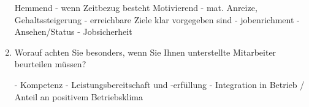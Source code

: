 \documentclass[12pt,a4paper]{scrreprt}
\begin{document}
\begin{enumerate}
Hemmend
- wenn Zeitbezug besteht
Motivierend
- mat. Anreize, Gehaltssteigerung
- erreichbare Ziele klar vorgegeben sind
- jobenrichment
- Ansehen/Status
- Jobsicherheit

\item Worauf achten Sie besonders, wenn Sie Ihnen unterstellte Mitarbeiter beurteilen müssen?

- Kompetenz
- Leistungsbereitschaft und -erfüllung
- Integration in Betrieb / Anteil an positivem Betriebsklima

\end{enumerate}
\end{document}
